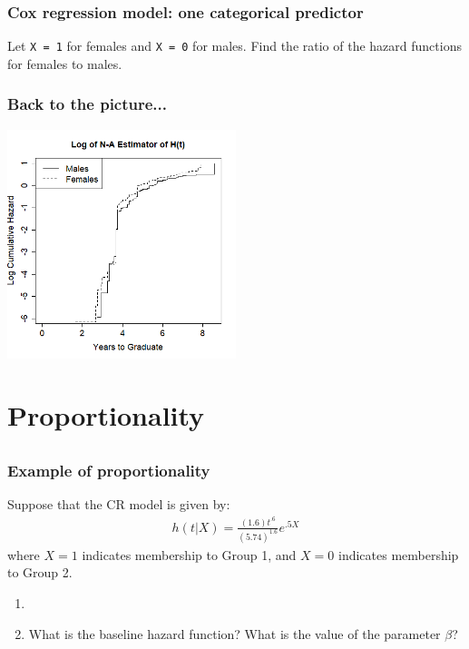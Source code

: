 \begin{frame}
\frametitle{Cox regression model: one categorical predictor}
Let \texttt{X = 1} for females and \texttt{X = 0} for males.  Find the ratio of the hazard functions for females to males.
\vskip200pt
\end{frame}

\begin{frame}
\frametitle{Back to the picture...}
\includegraphics[width=0.5\textwidth]{Figures/KM_logcumhaz_surv.png}
\end{frame}

\section[Proportionality]{Proportionality}
\subsection{}
\begin{frame}
\end{frame}

\begin{frame}
\frametitle{Example of proportionality}
Suppose that the CR model is given by:
\begin{eqnarray}
h(t|X) = \frac{(1.6)t^{.6}}{(5.74)^{1.6}}e^{.5X} \nonumber
\end{eqnarray}
where $X=1$ indicates membership to Group 1, and $X=0$ indicates membership to Group 2.
\begin{enumerate}
\item[]
\item What is the baseline hazard function? What is the value of the parameter $\beta$?
\end{enumerate}
\vskip200pt
\end{frame}

